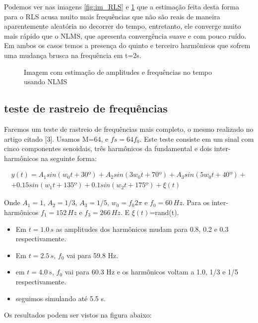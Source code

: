 Podemos ver nas imagens \ref{fig:im_RLS} e \ref{fig:im_NLMS} que a estimação feita desta forma para o RLS acusa muito mais frequências que não são reais de maneira aparentemente aleatória no decorrer do tempo, entretanto, ele converge muito mais rápido que o NLMS, que apresenta convergência suave e com pouco ruído. Em ambos os casos temos a presença do quinto e terceiro harmônicos que sofrem uma mudança brusca na frequência em t=2s.


\begin{figure}[H]
	\centering    
	\def\svgwidth{\columnwidth}
	
	\caption{Imagem com estimação de amplitudes e frequências no tempo usando NLMS}
	\label{fig:im_NLMS}
\end{figure}


\subsection{teste de rastreio de frequências}

Faremos um teste de rastreio de frequências mais completo, o mesmo realizado no artigo citado [3]. Usamos M=64, e $fs=64f_0$. Este teste consiste em um sinal com cinco componentes senoidais, três harmônicos da fundamental e dois inter-harmônicos na seguinte forma:

\begin{equation}
\begin{split}
	y(t)=A_1 sin(w_0 t+30º)+A_2 sin(3w_0 t+70º)+ A_3 sin(5w_0 t+40º) + \\ + 0.15 sin(w_1 t+135º)+ 0.1 sin(w_2 t + 175º) + \xi(t)
\end{split}
\end{equation}

Onde $A_1=1$, $A_2=1/3$, $A_3=1/5$, $w_0=f_0 2 \pi$ e $f_0=60 \, Hz$. Para os inter-harmônicos $f_1=152 \, Hz$ e $f_3= 266 \, Hz$. E $\xi(t)$=rand(t). 
\begin{itemize}
	\item Em $t=1.0 \,s$ as amplitudes dos harmônicos mudam para 0.8, 0.2 e 0.3 respectivamente. 
	\item Em $t=2.5 \,s$, $f_0$ vai para 59.8 Hz.
	\item em $t=4.0 \,s$, $f_0$ vai para 60.3 Hz e os harmônicos voltam a 1.0, 1/3 e 1/5 respectivamente.
	\item seguimos simulando até 5.5 s.
\end{itemize}

Os resultados podem ser vistos na figura abaixo: 


